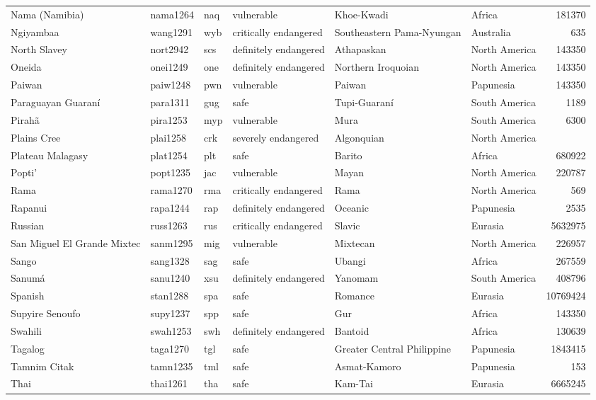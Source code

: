 \begin{longtable}{llllllr}
  Nama (Namibia) & nama1264 & naq & vulnerable & Khoe-Kwadi & Africa & 181370 \\ 
  Ngiyambaa & wang1291 & wyb & critically endangered & Southeastern Pama-Nyungan & Australia & 635 \\ 
  North Slavey & nort2942 & scs & definitely endangered & Athapaskan & North America & 143350 \\ 
  Oneida & onei1249 & one & definitely endangered & Northern Iroquoian & North America & 143350 \\ 
  Paiwan & paiw1248 & pwn & vulnerable & Paiwan & Papunesia & 143350 \\ 
  Paraguayan Guaraní & para1311 & gug & safe & Tupi-Guaraní & South America & 1189 \\ 
  Pirahã & pira1253 & myp & vulnerable & Mura & South America & 6300 \\ 
  Plains Cree & plai1258 & crk & severely endangered & Algonquian & North America &  \\ 
  Plateau Malagasy & plat1254 & plt & safe & Barito & Africa & 680922 \\ 
  Popti' & popt1235 & jac & vulnerable & Mayan & North America & 220787 \\ 
  Rama & rama1270 & rma & critically endangered & Rama & North America & 569 \\ 
  Rapanui & rapa1244 & rap & definitely endangered & Oceanic & Papunesia & 2535 \\ 
  Russian & russ1263 & rus & critically endangered & Slavic & Eurasia & 5632975 \\ 
  San Miguel El Grande Mixtec & sanm1295 & mig & vulnerable & Mixtecan & North America & 226957 \\ 
  Sango & sang1328 & sag & safe & Ubangi & Africa & 267559 \\ 
  Sanumá & sanu1240 & xsu & definitely endangered & Yanomam & South America & 408796 \\ 
  Spanish & stan1288 & spa & safe & Romance & Eurasia & 10769424 \\ 
  Supyire Senoufo & supy1237 & spp & safe & Gur & Africa & 143350 \\ 
  Swahili & swah1253 & swh & definitely endangered & Bantoid & Africa & 130639 \\ 
  Tagalog & taga1270 & tgl & safe & Greater Central Philippine & Papunesia & 1843415 \\ 
  Tamnim Citak & tamn1235 & tml & safe & Asmat-Kamoro & Papunesia & 153 \\ 
  Thai & thai1261 & tha & safe & Kam-Tai & Eurasia & 6665245 \\ 

\end{longtable}
